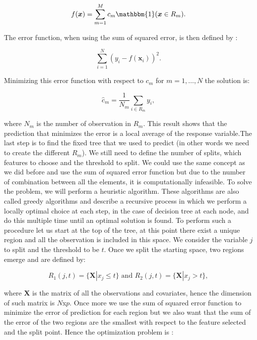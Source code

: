 \documentclass[a4paper,12pt]{article}
\numberwithin{equation}{section}
\begin{document}
\begin{equation}\label{eq:1}
f(\boldsymbol{x}) = \sum_{m=1}^Mc_m \mathbbm{1}(\boldsymbol{x} \in R_m).
\end{equation} 

The error function, when using the sum of squared error, is then defined by :

\begin{equation}\label{eq:2}
\sum_{i=1}^N (y_i - f(\boldsymbol{x}_i))^2.
\end{equation} 

Minimizing this error function with respect to $c_m$ for $m = 1,\dots,N$ the solution is:

\begin{equation}\label{eq:4}
\hat{c}_m= \frac{1}{N_m}\sum_{i \in R_m}y_i, 
\end{equation} 

\noindent
where $N_m$ is the number of observation in $R_m$. This result shows that the prediction that minimizes the error is a local average of the response variable.The last step is to find the fixed tree that we used to predict (in other words we need to create the different $R_m$). We still need to define the number of splits, which features to choose and the threshold to split. We could use the same concept as we did before and use the sum of squared error function but due to the number of combination between all the elements, it is computationally infeasible. To solve the problem, we will perform a heuristic algorithm. These algorithms are also called greedy algorithms and describe a recursive process in which we perform a locally optimal choice at each step, in the case of decision tree at each node, and do this multiple time until an optimal solution is found. To perform such a procedure let us start at the top of the tree, at this point there exist a unique region and all the observation is included in this space. We consider the variable $j$ to split and the threshold to be $t$. Once we split the starting space, two regions emerge and are defined by:

\begin{equation}\label{eq:5}
R_{1}(j,t) = \{\boldsymbol{X}|x_j \leq t\} \mbox{ and }R_2(j,t) = \{\boldsymbol{X}|x_j>t\},
\end{equation} 

where $\boldsymbol{X}$ is the matrix of all the observations and covariates, hence the dimension of such matrix is $N$x$p$. Once more we use the sum of squared error function to minimize the error of prediction for each region but we also want that the sum of the error of the two regions are the smallest with respect to the feature selected and the split point. Hence the optimization problem is :
\end{document}
